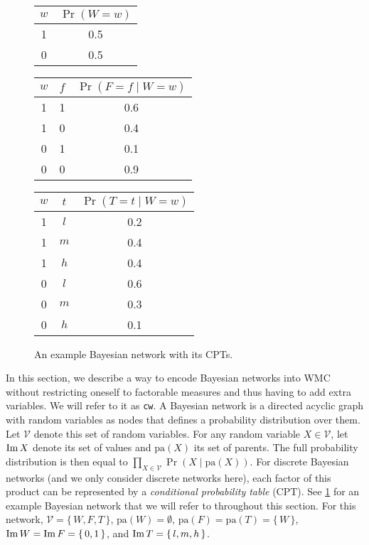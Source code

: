 \begin{figure}[t]
  \centering
    \\
    \begin{tabular}[t]{cc}
      \toprule
      $w$ & $\Pr(W = w)$ \\
      \midrule
      1 & 0.5 \\
      0 & 0.5 \\
      \bottomrule
    \end{tabular}
    \begin{tabular}[t]{ccc}
      \toprule
      $w$ & $f$ & $\Pr(F = f \mid W = w)$ \\
      \midrule
      1 & 1 & 0.6 \\
      1 & 0 & 0.4 \\
      0 & 1 & 0.1 \\
      0 & 0 & 0.9 \\
      \bottomrule
    \end{tabular}
    \begin{tabular}[t]{ccc}
      \toprule
      $w$ & $t$ & $\Pr(T = t \mid W = w)$ \\
      \midrule
      1 & $l$ & 0.2 \\
      1 & $m$ & 0.4 \\
      1 & $h$ & 0.4 \\
      0 & $l$ & 0.6 \\
      0 & $m$ & 0.3 \\
      0 & $h$ & 0.1 \\
      \bottomrule
    \end{tabular}
  \caption{An example Bayesian network with its CPTs.}\label{fig:example_bn}
\end{figure}

In this section, we describe a way to encode Bayesian networks into WMC without
restricting oneself to factorable measures and thus having to add extra
variables. We will refer to it as \texttt{cw}. A Bayesian network is a directed
acyclic graph with random variables as nodes that defines a probability
distribution over them. Let $\mathcal{V}$ denote this set of random variables.
For any random variable $X \in \mathcal{V}$, let $\operatorname{Im} X$ denote its set of
values and $\mathrm{pa}(X)$ its set of parents. The full probability
distribution is then equal to
$\prod_{X \in \mathcal{V}} \Pr(X \mid \mathrm{pa}(X))$. For discrete Bayesian
networks (and we only consider discrete networks here), each factor of this
product can be represented by a \emph{conditional probability table} (CPT). See
\cref{fig:example_bn} for an example Bayesian network that we will refer to
throughout this section. For this network, $\mathcal{V} = \{\, W, F, T \,\}$,
$\mathrm{pa}(W) = \emptyset$, $\mathrm{pa}(F) = \mathrm{pa}(T) = \{\, W \,\}$,
$\operatorname{Im} W = \operatorname{Im} F = \{\, 0, 1 \,\}$, and $\operatorname{Im} T = \{\, l, m, h \,\}$.

